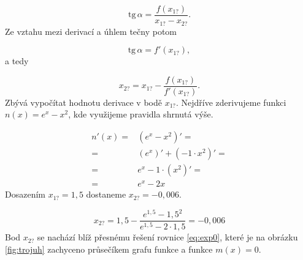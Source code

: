 \documentclass[a4paper,oneside,12pt]{article}
\begin{document}
\begin{equation*}
\mathrm{tg\,} \alpha = \frac{f(x_{1?})}{x_{1?} - x_{2?}}.
\end{equation*}
%
Ze vztahu mezi derivací a úhlem tečny potom

\begin{equation*}
\mathrm{tg\,} \alpha = f'(x_{1?}),
\end{equation*}
%
a tedy

\begin{equation*}
x_{2?} = x_{1?} - \frac{f(x_{1?}) }{f'(x_{1?})}.
\end{equation*}
%
Zbývá vypočítat hodnotu derivace v bodě $x_{1?}$. Nejdříve
zderivujeme funkci $n(x) = e^x - x^2$, kde využijeme 
pravidla shrnutá výše.

\begin{align*}
n'(x) = {} & (e^x - x^2)' = \\
	  = {} & (e^x)' + (-1 \cdot x^2)' = \\
      = {} & e^x - 1 \cdot (x^2)' = \\
      = {} & e^x - 2x
\end{align*}
%
Dosazením $x_{1?}=1,5$ dostaneme $x_{2?}=-0,006$. 

\begin{equation*}
x_{2?} = 1,5 - \frac{e^{1,5} - 1,5^2}{e^{1,5} - 2 \cdot 1,5} = -0,006
\end{equation*}
%
Bod $x_{2?}$ se nachází blíž přesnému řešení 
rovnice \ref{eq:exp0}, které je na obrázku \ref{fig:trojuh} 
zachyceno průsečíkem grafu funkce a funkce $m(x)=0$.
\end{document}
